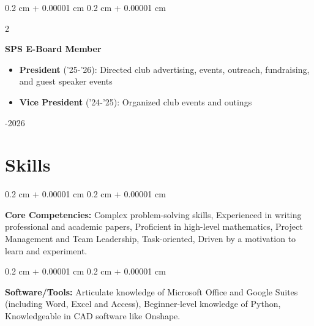 \documentclass[10pt, letterpaper]{article}
\newenvironment{highlights}{
\begin{itemize}[
topsep=0.10 cm,
parsep=0.10 cm,
partopsep=0pt,
itemsep=0pt,
leftmargin=0.4 cm + 10pt
]
}{
\end{itemize}
}
\newenvironment{onecolentry}{
\begin{adjustwidth}{
0.2 cm + 0.00001 cm
}{
0.2 cm + 0.00001 cm
}
}{
\end{adjustwidth}
}
\newenvironment{twocolentry}[2][]{
\begin{onecolentry}
\def\secondColumn{#2}
\setcolumnwidth{\fill, 4.5 cm}
\begin{paracol}{2}
}{
\switchcolumn \raggedleft \secondColumn
\end{paracol}
\end{onecolentry}
}
\begin{document}
\begin{twocolentry}{
2024-2026
}
\textbf{SPS E-Board Member}
\begin{highlights}
\item \textbf{President} ('25-'26): Directed club advertising, events, outreach, fundraising, and guest speaker events
\item \textbf{Vice President} ('24-'25): Organized club events and outings
\end{highlights}
\end{twocolentry}


\section{Skills}

\begin{onecolentry}
\textbf{Core Competencies:} Complex problem-solving skills, Experienced in writing professional and academic papers, Proficient in high-level mathematics, Project Management and Team Leadership, Task-oriented, Driven by a motivation to learn and experiment.
\end{onecolentry}

\vspace{0.2 cm}

\begin{onecolentry}
\textbf{Software/Tools:} Articulate knowledge of Microsoft Office and Google Suites (including Word, Excel and Access), Beginner-level knowledge of Python, Knowledgeable in CAD software like Onshape.
\end{onecolentry}
\end{document}
